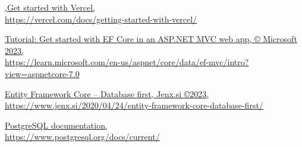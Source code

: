 \documentclass[12pt, a4paper]{report}
\theoremstyle{definition}
\begin{document}
\begin{thebibliography}{80}
     \href{https://vercel.com/docs/getting-started-with-vercel}{\color{black},Get started with Vercel,\\https://vercel.com/docs/getting-started-with-vercel/}
    
     \href{https://learn.microsoft.com/en-us/aspnet/core/data/ef-mvc/intro?view=aspnetcore-7.0}{\color{black}Tutorial: Get started with EF Core in an ASP.NET MVC web app, © Microsoft 2023, \\https://learn.microsoft.com/en-us/aspnet/core/data/ef-mvc/intro?view=aspnetcore-7.0}

     \href{https://www.jenx.si/2020/04/24/entity-framework-core-database-first/}{\color{black}Entity Framework Core – Database first, Jenx.si ©2023, \\https://www.jenx.si/2020/04/24/entity-framework-core-database-first/}
   
     \href{ https://www.postgresql.org/docs/current/}{\color{black}PostgreSQL documentation,\\ https://www.postgresql.org/docs/current/}

 
\end{thebibliography}
\end{document}
